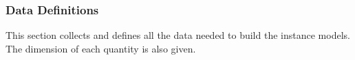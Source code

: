 \documentclass[12pt]{article}
\begin{document}





\newpage
\subsubsection{Data Definitions}\label{sec_datadef}



This section collects and defines all the data needed to build the instance
models. The dimension of each quantity is also given.  

~\newline
\end{document}

